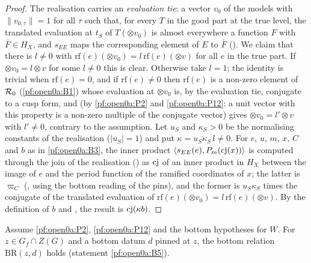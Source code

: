 \begin{proof}
The realisation carries an \emph{evaluation tie}: a vector $v_0$ of the models with $\|v_{0,\tau}\|=1$ for all $\tau$ such
that, for every $T$ in the good part at the true level, the translated evaluation at $t_S$ of $T(\otimes v_0)$ is almost
everywhere a function $F$ with $\bar F\in H_X$, and $s_{EE}$ maps the corresponding element of $E$ to $\bar F$
(). We claim that there is $l\ne0$ with
$\mathrm{rf}(e)(\otimes v_0)=l\,\mathrm{rf}(e)(\otimes v)$ for all $e$ in the true part. If $\otimes v_0=l\otimes v$ for
some $l\ne0$ this is clear. Otherwise take $l=1$; the identity is trivial when $\mathrm{rf}(e)=0$, and if
$\mathrm{rf}(e)\ne0$ then $\mathrm{rf}(e)$ is a non-zero element of $\mathcal{R}_0$ (\ref{pf:open0a:B1}) whose
evaluation at $\otimes v_0$ is, by the evaluation tie, conjugate to a cusp form, and
 (by \ref{pf:open0a:P2} and \ref{pf:open0a:P12}: a unit vector
with this property is a non-zero multiple of the conjugate vector) gives $\otimes v_0=l'\otimes v$ with $l'\ne0$,
contrary to the assumption. Let $u_S$ and $\kappa_S>0$ be the normalising constants of the realisation ($|u_S|=1$) and put
$\kappa=\overline{u_S\kappa_S}\,l\ne0$. For $e$, $u$, $m$, $x$, $C$ and $b$ as in \ref{pf:open0a:B3}, the inner product
$\langle s_{EE}(e),P_m(\operatorname{cj}(x))\rangle$ is computed through the join of the realisation
() as $\operatorname{cj}$ of an inner product in $H_X$ between the image of
$e$ and the period function of the ramified coordinates of $x$; the latter is $\varpi_C$
(, using the bottom reading of the pins), and the former is
$u_S\kappa_S$ times the conjugate of the translated evaluation of $\mathrm{rf}(e)(\otimes v_0)=l\,\mathrm{rf}(e)(\otimes v)$.
By the definition of $b$ and , the result is
$\operatorname{cj}(\kappa b)$.
\end{proof}

\begin{proposition}\label{pf:open0a:botrel}
Assume \ref{pf:open0a:P2}, \ref{pf:open0a:P12} and the bottom hypotheses for $W$. For $z\in G_f\cap Z(G)$ and a bottom
datum $d$ pinned at $z$, the bottom relation $\mathrm{BR}(z,d)$ holds (statement \ref{pf:open0a:B5}).
\end{proposition}


